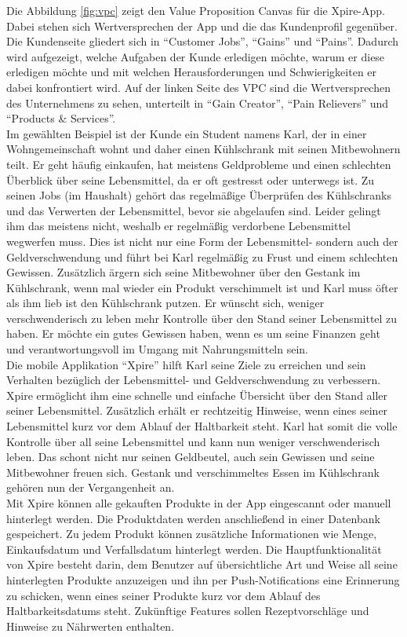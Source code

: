 Die Abbildung \ref{fig:vpc} zeigt den Value Proposition Canvas für die Xpire-App. Dabei stehen sich Wertversprechen der App und die das Kundenprofil gegenüber. Die Kundenseite gliedert sich in \enquote{Customer Jobs}, \enquote{Gains} und \enquote{Pains}. Dadurch wird aufgezeigt, welche Aufgaben der Kunde erledigen möchte, warum er diese erledigen möchte und mit welchen Herausforderungen und Schwierigkeiten er dabei konfrontiert wird. Auf der linken Seite des VPC sind die Wertversprechen des Unternehmens zu sehen, unterteilt in \enquote{Gain Creator}, \enquote{Pain Relievers} und \enquote{Products \& Services}.\\
Im gewählten Beispiel ist der Kunde ein Student namens Karl, der in einer Wohngemeinschaft wohnt und daher einen Kühlschrank mit seinen Mitbewohnern teilt. Er geht häufig einkaufen, hat meistens Geldprobleme und einen schlechten Überblick über seine Lebensmittel, da er oft gestresst oder unterwegs ist. Zu seinen Jobs (im Haushalt) gehört das regelmäßige Überprüfen des Kühlschranks und das Verwerten der Lebensmittel, bevor sie abgelaufen sind. Leider gelingt ihm das meistens nicht, weshalb er regelmäßig verdorbene Lebensmittel wegwerfen muss. Dies ist nicht nur eine Form der Lebensmittel- sondern auch der Geldverschwendung und führt bei Karl regelmäßig zu Frust und einem schlechten Gewissen. Zusätzlich ärgern sich seine Mitbewohner über den Gestank im Kühlschrank, wenn mal wieder ein Produkt verschimmelt ist und Karl muss öfter als ihm lieb ist den Kühlschrank putzen. Er wünscht sich, weniger verschwenderisch zu leben mehr Kontrolle über den Stand seiner Lebensmittel zu haben. Er möchte ein gutes Gewissen haben, wenn es um seine Finanzen geht und verantwortungsvoll im Umgang mit Nahrungsmitteln sein.\\
Die mobile Applikation \enquote{Xpire} hilft Karl seine Ziele zu erreichen und sein Verhalten bezüglich der Lebensmittel- und Geldverschwendung zu verbessern. Xpire ermöglicht ihm eine schnelle und einfache Übersicht über den Stand aller seiner Lebensmittel. Zusätzlich erhält er rechtzeitig Hinweise, wenn eines seiner Lebensmittel kurz vor dem Ablauf der Haltbarkeit steht. Karl hat somit die volle Kontrolle über all seine Lebensmittel und kann nun weniger verschwenderisch leben. Das schont nicht nur seinen Geldbeutel, auch sein Gewissen und seine Mitbewohner freuen sich. Gestank und verschimmeltes Essen im Kühlschrank gehören nun der Vergangenheit an.\\
Mit Xpire können alle gekauften Produkte in der App eingescannt oder manuell hinterlegt werden. Die Produktdaten werden anschließend in einer Datenbank gespeichert. Zu jedem Produkt können zusätzliche Informationen wie Menge, Einkaufsdatum und Verfallsdatum hinterlegt werden. Die Hauptfunktionalität von Xpire besteht darin, dem Benutzer auf übersichtliche Art und Weise all seine hinterlegten Produkte anzuzeigen und ihn per Push-Notifications eine Erinnerung zu schicken, wenn eines seiner Produkte kurz vor dem Ablauf des Haltbarkeitsdatums steht. Zukünftige Features sollen Rezeptvorschläge und Hinweise zu Nährwerten enthalten. 

